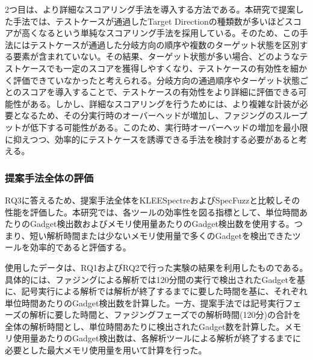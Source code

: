 2つ目は、より詳細なスコアリング手法を導入する方法である。本研究で提案した手法では、テストケースが通過したTarget Directionの種類数が多いほどスコアが高くなるという単純なスコアリング手法を採用している。そのため、この手法にはテストケースが通過した分岐方向の順序や複数のターゲット状態を区別する要素が含まれていない。その結果、ターゲット状態が多い場合、どのようなテストケースでも一定のスコアを獲得しやすくなり、テストケースの有効性を細かく評価できていなかったと考えられる。分岐方向の通過順序やターゲット状態ごとのスコアを導入することで、テストケースの有効性をより詳細に評価できる可能性がある。しかし、詳細なスコアリングを行うためには、より複雑な計装が必要となるため、その分実行時のオーバーヘッドが増加し、ファジングのスループットが低下する可能性がある。このため、実行時オーバーヘッドの増加を最小限に抑えつつ、効率的にテストケースを誘導できる手法を検討する必要があると考える。\par


\subsubsection{提案手法全体の評価}
RQ3に答えるため、提案手法全体をKLEESpectreおよびSpecFuzzと比較しその性能を評価した。本研究では、各ツールの効率性を図る指標として、単位時間あたりのGadget検出数およびメモリ使用量あたりのGadget検出数を使用する。つまり、短い解析時間または少ないメモリ使用量で多くのGadgetを検出できたツールを効率的であると評価する。

使用したデータは、RQ1およびRQ2で行った実験の結果を利用したものである。具体的には、ファジングによる解析では120分間の実行で検出されたGadgetを基に、記号実行による解析では解析が終了するまでに要した時間を基に、それぞれ単位時間あたりのGadget検出数を計算した。一方、提案手法では記号実行フェーズの解析に要した時間と、ファジングフェーズでの解析時間(120分)の合計を全体の解析時間とし、単位時間あたりに検出されたGadget数を計算した。メモリ使用量あたりのGadget検出数は、各解析ツールによる解析が終了するまでに必要とした最大メモリ使用量を用いて計算を行った。\par

